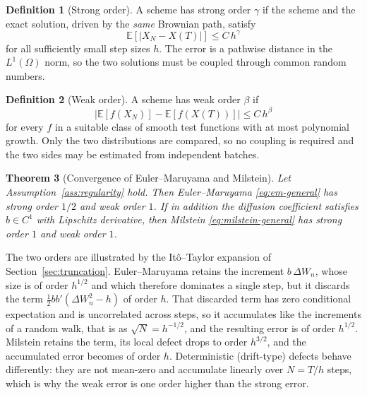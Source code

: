 \documentclass[11pt,a4paper]{article}
\newtheorem{theorem}{Theorem}[section]
\theoremstyle{definition}
\newtheorem{definition}[theorem]{Definition}
\theoremstyle{remark}
\begin{document}
\begin{definition}[Strong order]
\label{def:strong}
A scheme has strong order $\gamma$ if the scheme and the exact solution, driven by the \emph{same} Brownian path, satisfy
\begin{equation}
    \mathbb{E}\!\left[ \left| X_N - X(T) \right| \right] \le C\, h^{\gamma}
    \label{eq:strong-order}
\end{equation}
for all sufficiently small step sizes $h$. The error is a pathwise distance in the $L^1(\Omega)$ norm, so the two solutions must be coupled through common random numbers.
\end{definition}

\begin{definition}[Weak order]
\label{def:weak}
A scheme has weak order $\beta$ if
\begin{equation}
    \left| \mathbb{E}\!\left[ f(X_N) \right] - \mathbb{E}\!\left[ f(X(T)) \right] \right| \le C\, h^{\beta}
    \label{eq:weak-order}
\end{equation}
for every $f$ in a suitable class of smooth test functions with at most polynomial growth. Only the two distributions are compared, so no coupling is required and the two sides may be estimated from independent batches.
\end{definition}

\begin{theorem}[Convergence of Euler--Maruyama and Milstein]
\label{thm:convergence}
Let Assumption~\ref{ass:regularity} hold. Then Euler--Maruyama \eqref{eq:em-general} has strong order $1/2$ and weak order $1$. If in addition the diffusion coefficient satisfies $b \in C^1$ with Lipschitz derivative, then Milstein \eqref{eq:milstein-general} has strong order $1$ and weak order $1$.
\end{theorem}

The two orders are illustrated by the It\^o--Taylor expansion of Section~\ref{sec:truncation}. Euler--Maruyama retains the increment $b\,\Delta W_n$, whose size is of order $h^{1/2}$ and which therefore dominates a single step, but it discards the term $\tfrac12 b b'(\Delta W_n^2 - h)$ of order $h$. That discarded term has zero conditional expectation and is uncorrelated across steps, so it accumulates like the increments of a random walk, that is as $\sqrt{N} = h^{-1/2}$, and the resulting error is of order $h^{1/2}$. Milstein retains the term, its local defect drops to order $h^{3/2}$, and the accumulated error becomes of order $h$. Deterministic (drift-type) defects behave differently: they are not mean-zero and accumulate linearly over $N = T/h$ steps, which is why the weak error is one order higher than the strong error.
\end{document}
